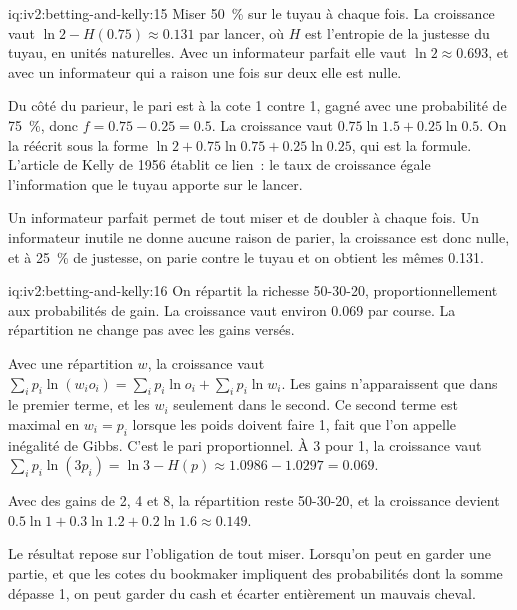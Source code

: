 \begin{solution}{iq:iv2:betting-and-kelly:15}
Miser 50~\% sur le tuyau à chaque fois. La croissance vaut $\ln 2 - H(0.75) \approx 0.131$ par lancer, où $H$ est l'entropie de la justesse du tuyau, en unités naturelles. Avec un informateur parfait elle vaut $\ln 2 \approx 0.693$, et avec un informateur qui a raison une fois sur deux elle est nulle.

Du côté du parieur, le pari est à la cote 1 contre 1, gagné avec une probabilité de 75~\%, donc $f = 0.75 - 0.25 = 0.5$. La croissance vaut $0.75\ln 1.5 + 0.25\ln 0.5$. On la réécrit sous la forme $\ln 2 + 0.75\ln 0.75 + 0.25\ln 0.25$, qui est la formule. L'article de Kelly de 1956 établit ce lien~: le taux de croissance égale l'information que le tuyau apporte sur le lancer.

Un informateur parfait permet de tout miser et de doubler à chaque fois. Un informateur inutile ne donne aucune raison de parier, la croissance est donc nulle, et à 25~\% de justesse, on parie contre le tuyau et on obtient les mêmes 0.131.

\end{solution}

\begin{solution}{iq:iv2:betting-and-kelly:16}
On répartit la richesse 50-30-20, proportionnellement aux probabilités de gain. La croissance vaut environ 0.069 par course. La répartition ne change pas avec les gains versés.

Avec une répartition $w$, la croissance vaut $\sum_i p_i\ln(w_i o_i) = \sum_i p_i\ln o_i + \sum_i p_i\ln w_i$. Les gains n'apparaissent que dans le premier terme, et les $w_i$ seulement dans le second. Ce second terme est maximal en $w_i = p_i$ lorsque les poids doivent faire 1, fait que l'on appelle inégalité de Gibbs. C'est le pari proportionnel. À 3 pour 1, la croissance vaut $\sum_i p_i\ln(3p_i) = \ln 3 - H(p) \approx 1.0986 - 1.0297 = 0.069$.

Avec des gains de 2, 4 et 8, la répartition reste 50-30-20, et la croissance devient $0.5\ln 1 + 0.3\ln 1.2 + 0.2\ln 1.6 \approx 0.149$.

Le résultat repose sur l'obligation de tout miser. Lorsqu'on peut en garder une partie, et que les cotes du bookmaker impliquent des probabilités dont la somme dépasse 1, on peut garder du cash et écarter entièrement un mauvais cheval.

\end{solution}

